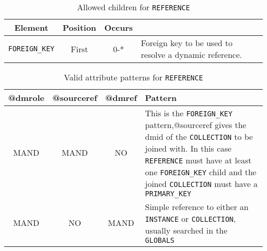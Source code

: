 \begin{table}[!htbp]
\small
\centering
\begin{tabulary}{\linewidth}{|c |c |c|J|}
    \hline 
        \textbf{Element} &
        \textbf{Position} &
        \textbf{Occurs} &
        \\
    \hline      \hline  
        \texttt{FOREIGN\_KEY}  &        
        First &           
        0-* &
        Foreign key to be used to resolve a dynamic reference.\\
    \hline 
\end{tabulary}
     \caption{Allowed children for \texttt{REFERENCE}} 
     \label{tbl:reference-children}
\end{table}


\begin{table}[!htbp]
\small
\centering
\begin{tabulary}{\linewidth}{|c|c|c|J|}
    \hline 
        \textbf{@dmrole} &
        \textbf{@sourceref} &
        \textbf{@dmref} &
        \textbf{Pattern}\\
    \hline      \hline  
        MAND &           
        MAND &           
        NO &           
        This is the \texttt{FOREIGN\_KEY} pattern,@sourceref gives the dmid of the \texttt{COLLECTION} to be joined with. In this case \texttt{REFERENCE} must have at least one \texttt{FOREIGN\_KEY} child and the joined \texttt{COLLECTION} must have a \texttt{PRIMARY\_KEY}\\
    \hline   
        MAND &           
        NO &           
        MAND &           
        Simple reference to either an \texttt{INSTANCE} or \texttt{COLLECTION}, usually searched in the \texttt{GLOBALS}\\
   \hline 
\end{tabulary}
     \caption{Valid attribute patterns for  \texttt{REFERENCE}}
     \label{tbl:reference-pattern}
\end{table}

